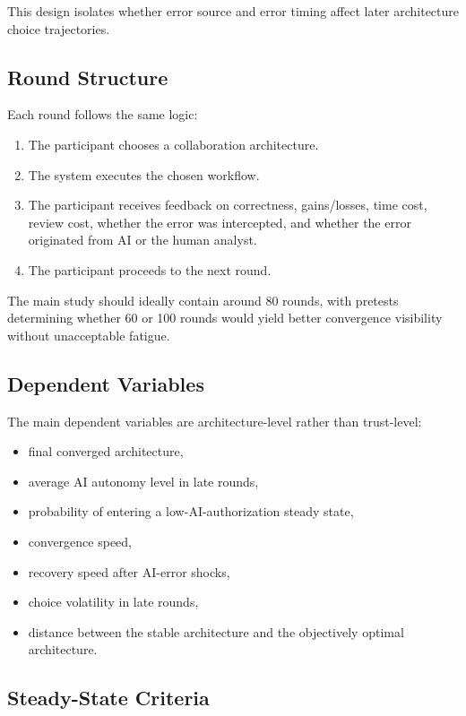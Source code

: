 This design isolates whether error source and error timing affect later architecture choice trajectories.

\subsection{Round Structure}

Each round follows the same logic:

\begin{enumerate}[label=\arabic*.]
    \item The participant chooses a collaboration architecture.
    \item The system executes the chosen workflow.
    \item The participant receives feedback on correctness, gains/losses, time cost, review cost, whether the error was intercepted, and whether the error originated from AI or the human analyst.
    \item The participant proceeds to the next round.
\end{enumerate}

The main study should ideally contain around 80 rounds, with pretests determining whether 60 or 100 rounds would yield better convergence visibility without unacceptable fatigue.

\subsection{Dependent Variables}

The main dependent variables are architecture-level rather than trust-level:

\begin{itemize}[leftmargin=1.5em]
    \item final converged architecture,
    \item average AI autonomy level in late rounds,
    \item probability of entering a low-AI-authorization steady state,
    \item convergence speed,
    \item recovery speed after AI-error shocks,
    \item choice volatility in late rounds,
    \item distance between the stable architecture and the objectively optimal architecture.
\end{itemize}

\subsection{Steady-State Criteria}

